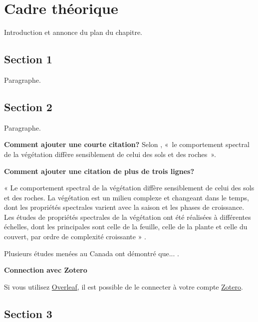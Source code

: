 \chapter{Cadre théorique} \label{chap:cadre_theoriques}

Introduction et annonce du plan du chapitre.

\lipsum[1]

\section{Section 1} \label{sec:titre_cth_section1}

Paragraphe.
\lipsum[1] %


\section{Section 2} \label{sec:titre_cth_section2}

Paragraphe.
\lipsum[1] %

\textbf{Comment ajouter une courte citation?} Selon \textcite[69]{bonn1992precis}, «~le comportement spectral de la végétation diffère sensiblement de celui des sols et des roches~».

\textbf{Comment ajouter une citation de plus de trois lignes?}

\begin{customquote}
« Le comportement spectral de la végétation diffère sensiblement de celui des sols et des roches. La végétation est un milieu complexe et changeant dans le temps, dont les propriétés spectrales varient avec la saison et les phases de croissance. Les études de propriétés spectrales de la végétation ont été réalisées à différentes échelles, dont les principales sont celle de la feuille, celle de la plante et celle du couvert, par ordre de complexité croissante » \parencite[69]{bonn1992precis}. 
\end{customquote}

Plusieurs études menées au Canada ont démontré que... \parencite{manaugh2017overcoming,winters2011motivators}.

\textbf{Connection avec Zotero}

Si vous utilisez \href{https://www.overleaf.com}{Overleaf}, il est possible de le connecter à votre compte 
\href{https://docs.overleaf.com/integrations-and-add-ons/reference-manager-integrations/zotero}{Zotero}.

\section{Section 3} \label{sec:titre_cth_section3}

\lipsum[1-4] %
